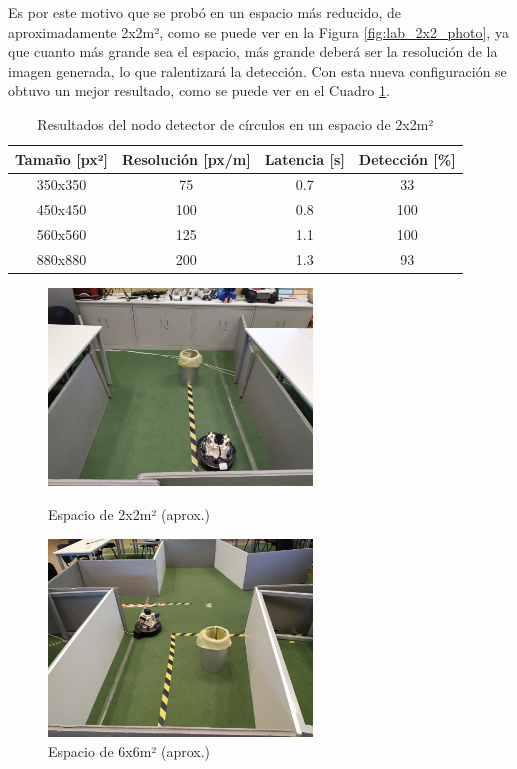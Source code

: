 Es por este motivo que se probó en un espacio más reducido, de aproximadamente
2x2m², como se puede ver en la Figura \ref{fig:lab_2x2_photo}, ya que cuanto más
grande sea el espacio, más grande deberá ser la resolución de la imagen
generada, lo que ralentizará la detección.
Con esta nueva configuración se obtuvo un mejor resultado, como se puede ver en
el Cuadro \ref{tab:circle_results_2x2}.

\begin{table}[h!]
\begin{center}
\begin{tabular}{|c|c|c|c|}
\hline
\textbf{Tamaño [px²]} & \textbf{Resolución [px/m]} & \textbf{Latencia [s]} & \textbf{Detección [\%]} \\
\hline
350x350 & 75  & 0.7 & 33  \\
450x450 & 100 & 0.8 & 100 \\
560x560 & 125 & 1.1 & 100 \\
880x880 & 200 & 1.3 & 93  \\
\hline
\end{tabular}
\caption{Resultados del nodo detector de círculos en un espacio de 2x2m²}
\label{tab:circle_results_2x2}
\end{center}
\end{table}

\begin{figure}[h!]
  \centering
  \begin{minipage}{0.45\textwidth}
    \centering
    \includegraphics[width=7cm]{figs/lab_2x2_photo}
    \caption{Espacio de 2x2m² (aprox.)}
    \label{fig:lab_2x2_photo}
  \end{minipage}
  \hfill
  \begin{minipage}{0.45\textwidth}
    \centering
    \includegraphics[width=7cm]{figs/lab_6x6_photo}
    \caption{Espacio de 6x6m² (aprox.)}
    \label{fig:lab_6x6_photo}
  \end{minipage}
\end{figure}\


